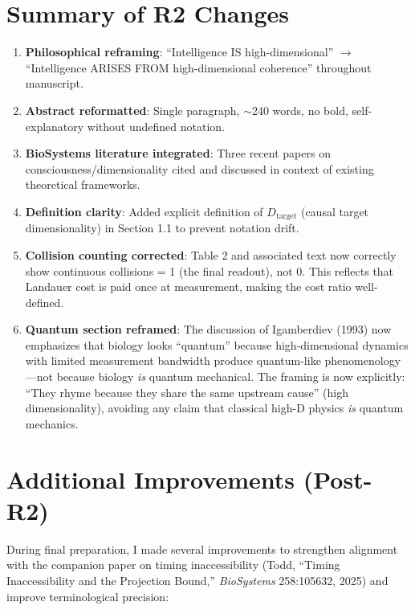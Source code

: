\documentclass[11pt]{article}
\begin{document}
\section*{Summary of R2 Changes}

\begin{enumerate}
\item \textbf{Philosophical reframing}: ``Intelligence IS high-dimensional'' $\to$ ``Intelligence ARISES FROM high-dimensional coherence'' throughout manuscript.

\item \textbf{Abstract reformatted}: Single paragraph, $\sim$240 words, no bold, self-explanatory without undefined notation.

\item \textbf{BioSystems literature integrated}: Three recent papers on consciousness/dimensionality cited and discussed in context of existing theoretical frameworks.

\item \textbf{Definition clarity}: Added explicit definition of $D_{\text{target}}$ (causal target dimensionality) in Section 1.1 to prevent notation drift.

\item \textbf{Collision counting corrected}: Table 2 and associated text now correctly show continuous collisions = 1 (the final readout), not 0. This reflects that Landauer cost is paid once at measurement, making the cost ratio well-defined.

\item \textbf{Quantum section reframed}: The discussion of Igamberdiev (1993) now emphasizes that biology looks ``quantum'' because high-dimensional dynamics with limited measurement bandwidth produce quantum-like phenomenology---not because biology \textit{is} quantum mechanical. The framing is now explicitly: ``They rhyme because they share the same upstream cause'' (high dimensionality), avoiding any claim that classical high-D physics \textit{is} quantum mechanics.
\end{enumerate}

\section*{Additional Improvements (Post-R2)}

During final preparation, I made several improvements to strengthen alignment with the companion paper on timing inaccessibility (Todd, ``Timing Inaccessibility and the Projection Bound,'' \textit{BioSystems} 258:105632, 2025) and improve terminological precision:
\end{document}
